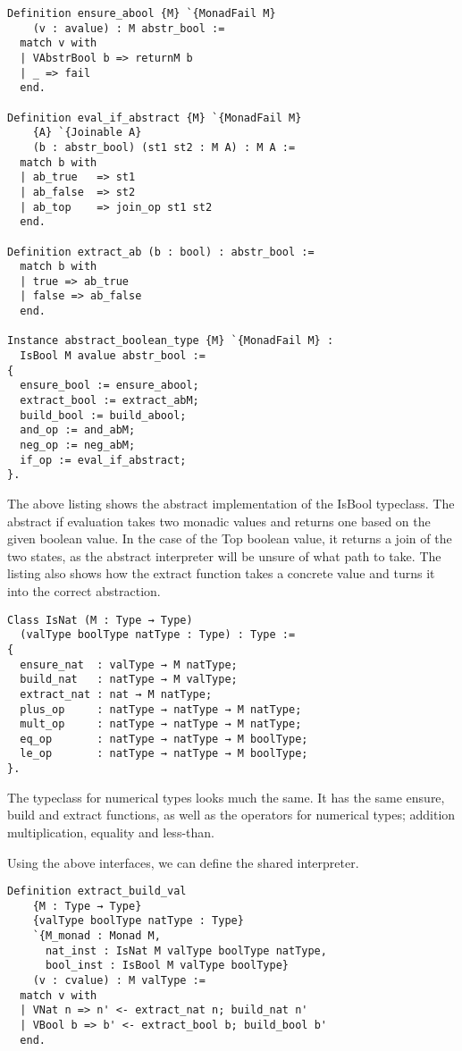{\begin{verbatim}
Definition ensure_abool {M} `{MonadFail M} 
    (v : avalue) : M abstr_bool :=
  match v with
  | VAbstrBool b => returnM b
  | _ => fail
  end.

Definition eval_if_abstract {M} `{MonadFail M} 
    {A} `{Joinable A} 
    (b : abstr_bool) (st1 st2 : M A) : M A :=
  match b with
  | ab_true   => st1
  | ab_false  => st2
  | ab_top    => join_op st1 st2
  end.

Definition extract_ab (b : bool) : abstr_bool := 
  match b with
  | true => ab_true
  | false => ab_false
  end.

Instance abstract_boolean_type {M} `{MonadFail M} : 
  IsBool M avalue abstr_bool :=
{
  ensure_bool := ensure_abool;
  extract_bool := extract_abM;
  build_bool := build_abool;
  and_op := and_abM;
  neg_op := neg_abM;
  if_op := eval_if_abstract;
}.
\end{verbatim}

The above listing shows the abstract implementation of the IsBool typeclass.
The abstract if evaluation takes two monadic values and returns one based on the
given boolean value. In the case of the Top boolean value, it returns a join of
the two states, as the abstract interpreter will be unsure of what path to
take. The listing also shows how the extract function takes a concrete value
and turns it into the correct abstraction.

\begin{verbatim}
Class IsNat (M : Type → Type)
  (valType boolType natType : Type) : Type :=
{
  ensure_nat  : valType → M natType;
  build_nat   : natType → M valType;
  extract_nat : nat → M natType;
  plus_op     : natType → natType → M natType;
  mult_op     : natType → natType → M natType;
  eq_op       : natType → natType → M boolType;
  le_op       : natType → natType → M boolType;
}.
\end{verbatim}

The typeclass for numerical types looks much the same. It has the same ensure,
build and extract functions, as well as the operators for numerical types;
addition multiplication, equality and less-than.

Using the above interfaces, we can define the shared interpreter.
\begin{verbatim}
Definition extract_build_val 
    {M : Type → Type} 
    {valType boolType natType : Type}
    `{M_monad : Monad M, 
      nat_inst : IsNat M valType boolType natType, 
      bool_inst : IsBool M valType boolType}
    (v : cvalue) : M valType :=
  match v with
  | VNat n => n' <- extract_nat n; build_nat n'
  | VBool b => b' <- extract_bool b; build_bool b'
  end.


\end{verbatim}}
